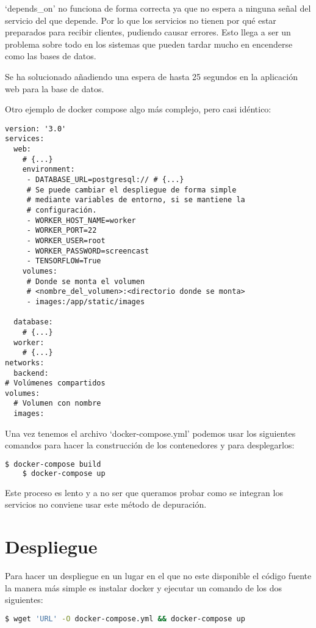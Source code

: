 `depends\_on' no funciona de forma correcta ya que no espera a ninguna señal del servicio del que depende. Por lo que los servicios no tienen por qué estar preparados para recibir clientes, pudiendo causar errores. Esto llega a ser un problema sobre todo en los sistemas que pueden tardar mucho en encenderse como las bases de datos.

Se ha solucionado añadiendo una espera de hasta 25 segundos en la aplicación web para la base de datos.

Otro ejemplo de docker compose algo más complejo, pero casi idéntico:


\begin{lstlisting}[language=dockercompose]
version: '3.0'
services:
  web:
    # {...}
    environment:
     - DATABASE_URL=postgresql:// # {...}
     # Se puede cambiar el despliegue de forma simple
     # mediante variables de entorno, si se mantiene la 
     # configuración.
     - WORKER_HOST_NAME=worker
     - WORKER_PORT=22
     - WORKER_USER=root
     - WORKER_PASSWORD=screencast
     - TENSORFLOW=True
    volumes:
     # Donde se monta el volumen 
     # <nombre_del_volumen>:<directorio donde se monta>
     - images:/app/static/images
 
  database:
    # {...}  
  worker:
    # {...}
networks:
  backend:
# Volúmenes compartidos
volumes:
  # Volumen con nombre
  images:
\end{lstlisting}


Una vez tenemos el archivo `docker-compose.yml' podemos usar los siguientes comandos para hacer la construcción de los contenedores y para desplegarlos:

\lstset{style=linestyle}
\begin{lstlisting}[language=bash]
    $ docker-compose build
    $ docker-compose up
\end{lstlisting}

Este proceso es lento y a no ser que queramos probar como se integran los servicios no conviene usar este método de depuración.

\section{Despliegue}

Para hacer un despliegue en un lugar en el que no este disponible el código fuente la manera más simple es instalar docker y ejecutar un comando de los dos siguientes:

\lstset{style=linestyle}
\begin{lstlisting}[language=bash]
$ wget 'URL' -O docker-compose.yml && docker-compose up
\end{lstlisting}

